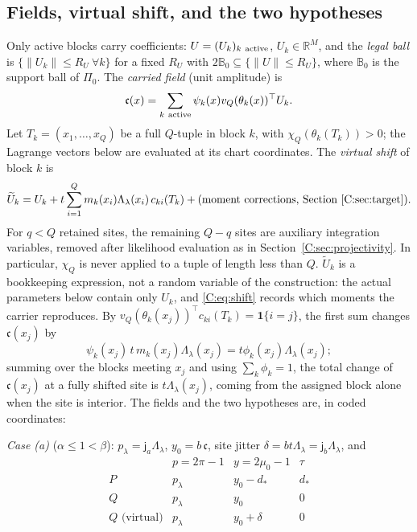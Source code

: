 \documentclass[11pt]{article}
\newcommand{\R}{\mathbb{R}}
\newcommand{\norm}[1]{\lVert #1\rVert}
\newcommand{\one}{\mathbf{1}}
\newcommand{\ja}{\mathsf{j}_a}
\newcommand{\jb}{\mathsf{j}_b}
\newcommand{\cf}{\mathfrak{c}}
\begin{document}
\subsection{Fields, virtual shift, and the two hypotheses}\label{C:sec:fields}
Only active blocks carry coefficients: \(U=(U_k)_{k\ \rm active}\),
\(U_k\in\R^M\), and the \emph{legal ball} is \(\{\norm{U_k}\le R_U\ \forall k\}\)
for a fixed \(R_U\) with \(2\mathbb B_0\subseteq\{\norm U\le R_U\}\), where
\(\mathbb B_0\) is the support ball of \(\Pi_0\).  The \emph{carried
field} (unit amplitude) is
\begin{equation}
 \cf(x)=\sum_{k\ \rm active}\psi_k(x)v_Q(\theta_k(x))^\top U_k .
 \label{C:eq:carried}
\end{equation}
Let \(T_k=(x_1,\dots,x_Q)\) be a full \(Q\)-tuple in block \(k\), with
\(\chi_Q(\theta_k(T_k))>0\); the Lagrange vectors below are evaluated at
its chart coordinates.  The \emph{virtual shift} of block \(k\) is
\begin{equation}
 \widetilde U_k=U_k+t\sum_{i=1}^Qm_k(x_i)\Lambda_\lambda(x_i)\,c_{ki}(T_k)
 +(\text{moment corrections, Section~\ref{C:sec:target}}).
 \label{C:eq:shift}
\end{equation}
For \(q<Q\) retained sites, the remaining \(Q-q\) sites are auxiliary
integration variables, removed after likelihood evaluation as in
Section~\ref{C:sec:projectivity}.  In particular, \(\chi_Q\) is never
applied to a tuple of length less than \(Q\).
\(\widetilde U_k\) is a bookkeeping expression, not a random variable of
the construction: the actual parameters below contain only \(U_k\), and
\eqref{C:eq:shift} records which moments the carrier reproduces.
By \(v_Q(\theta_k(x_j))^\top c_{ki}(T_k)=\one\{i=j\}\), the first sum
changes \(\cf(x_j)\) by
\[
 \psi_k(x_j)\,t\,m_k(x_j)\Lambda_\lambda(x_j)=t\phi_k(x_j)\Lambda_\lambda(x_j);
\]
summing over the blocks meeting \(x_j\) and using \(\sum_k\phi_k=1\), the
total change of \(\cf(x_j)\) at a fully shifted site is
\(t\Lambda_\lambda(x_j)\), coming from the assigned block alone when the
site is interior.  The fields and the two hypotheses are, in coded
coordinates:

\emph{Case (a)} (\(\alpha\le1<\beta\)): \(p_\lambda=\ja\Lambda_\lambda\),
\(y_0=b\,\cf\), site jitter \(\delta=bt\Lambda_\lambda=\jb\Lambda_\lambda\), and
\begin{equation}
\begin{array}{c|ccc}
 &p=2\pi-1&y=2\mu_0-1&\tau\\ \hline
 P&p_\lambda&y_0-d_*&d_*\\
 Q&p_\lambda&y_0&0\\ \hline
 Q\text{ (virtual)}&p_\lambda&y_0+\delta&0
\end{array}
\label{C:eq:two-sides-a}
\end{equation}
\end{document}
